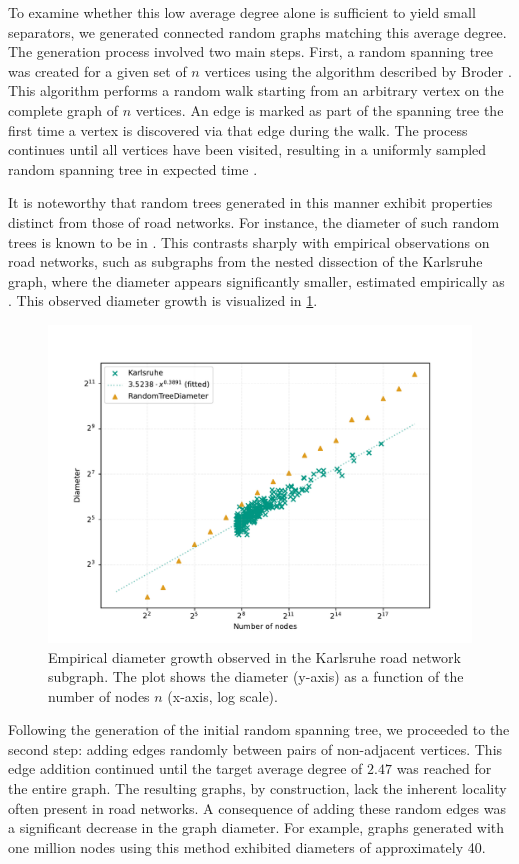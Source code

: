 To examine whether this low average degree alone is sufficient to yield small separators, we generated connected random graphs matching this average degree.
The generation process involved two main steps.
First, a random spanning tree was created for a given set of \(n\) vertices using the algorithm described by Broder \cite{broder_generating_1989}.
This algorithm performs a random walk starting from an arbitrary vertex on the complete graph of \(n\) vertices.
An edge is marked as part of the spanning tree the first time a vertex is discovered via that edge during the walk.
The process continues until all vertices have been visited, resulting in a uniformly sampled random spanning tree in expected time .

It is noteworthy that random trees generated in this manner exhibit properties distinct from those of road networks.
For instance, the diameter of such random trees is known to be in  \cite{chlamtac_tree-based_1987}.
This contrasts sharply with empirical observations on road networks, such as subgraphs from the nested dissection of the Karlsruhe graph, where the diameter appears significantly smaller, estimated empirically as .
This observed diameter growth is visualized in \cref{fig:diameter_karlsruhe}.

\begin{figure}
    \centering
    \includegraphics[width=0.6\linewidth]{graphics/diameters.pdf} 
    \caption{Empirical diameter growth observed in the Karlsruhe road network subgraph. The plot shows the diameter (y-axis) as a function of the number of nodes \(n\) (x-axis, log scale).}
    \label{fig:diameter_karlsruhe}
\end{figure}

Following the generation of the initial random spanning tree, we proceeded to the second step: adding edges randomly between pairs of non-adjacent vertices.
This edge addition continued until the target average degree of \(2.47\) was reached for the entire graph.
The resulting graphs, by construction, lack the inherent locality often present in road networks.
A consequence of adding these random edges was a significant decrease in the graph diameter.
For example, graphs generated with one million nodes using this method exhibited diameters of approximately 40.

